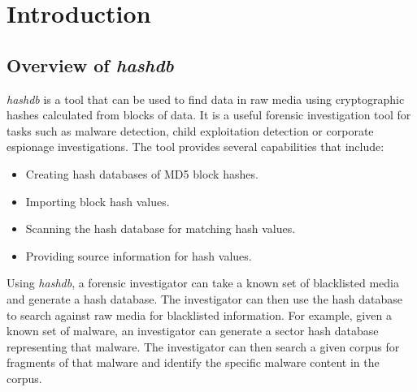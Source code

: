 \documentclass[11pt,fleqn]{article} %
\begin{document}
\newcommand \hdb {\textit{hashdb}\xspace}
\newcommand \sscope {\textit{SectorScope}\xspace}
\newcommand \aut {\textbf{Autopsy}\xspace}
\newcommand \bulk {\textbf{bulk\_extractor}\xspace}





\setlength{\parindent}{0pt} %
\newpage
\thispagestyle{empty}
\mbox{}
\newpage


\tableofcontents
\newpage
{}





\newpage

\section{Introduction}
\subsection {Overview of \hdb}
\hdb is a tool that can be used to find data in raw media using cryptographic hashes calculated from blocks of data. It is a useful forensic investigation tool for tasks such as malware detection, child exploitation detection or corporate espionage investigations. The tool provides several capabilities that include:
\begin{itemize}
\item Creating hash databases of MD5 block hashes.
\item Importing block hash values.
\item Scanning the hash database for matching hash values.
\item Providing source information for hash values. 
\end{itemize}

Using \hdb, a forensic investigator can take a known set of blacklisted media and generate a hash database. The investigator can then use the hash database to search against raw media for blacklisted information. For example, given a known set of malware, an investigator can generate a sector hash database representing that malware. The investigator can then search a given corpus for fragments of that malware and identify the specific malware content in the corpus.\\
\end{document}
